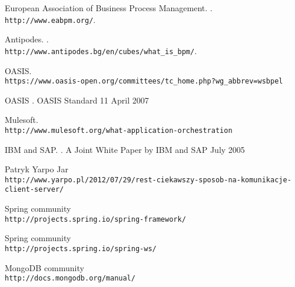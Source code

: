 \documentclass[11pt]{aghdpl}
\author{Tomasz Landowski}
\date{2014}
\begin{document}
\titlepages
\setcounter{tocdepth}{3}
\tableofcontents
\clearpage








\begin{thebibliography}{1}

%
%

European Association of Business Process Management.
.
\newblock \\\texttt{http://www.eabpm.org/}.


Antipodes.
.
\newblock \\\texttt{http://www.antipodes.bg/en/cubes/what\_is\_bpm/}.

OASIS.
\newblock \\\texttt{https://www.oasis-open.org/committees/tc\_home.php?wg\_abbrev=wsbpel}

OASIS
.
\newblock OASIS Standard 11 April 2007 

Mulesoft.
\newblock \\\texttt{http://www.mulesoft.org/what-application-orchestration}

IBM and SAP.
.
\newblock A Joint White Paper by IBM and SAP July 2005 

Patryk Yarpo Jar
\newblock \\\texttt{http://www.yarpo.pl/2012/07/29/rest-ciekawszy-sposob-na-komunikacje-client-server/}

Spring community
\newblock \\\texttt{http://projects.spring.io/spring-framework/}

Spring community
\newblock \\\texttt{http://projects.spring.io/spring-ws/}

MongoDB community
\newblock \\\texttt{http://docs.mongodb.org/manual/}


\end{thebibliography}
\end{document}
